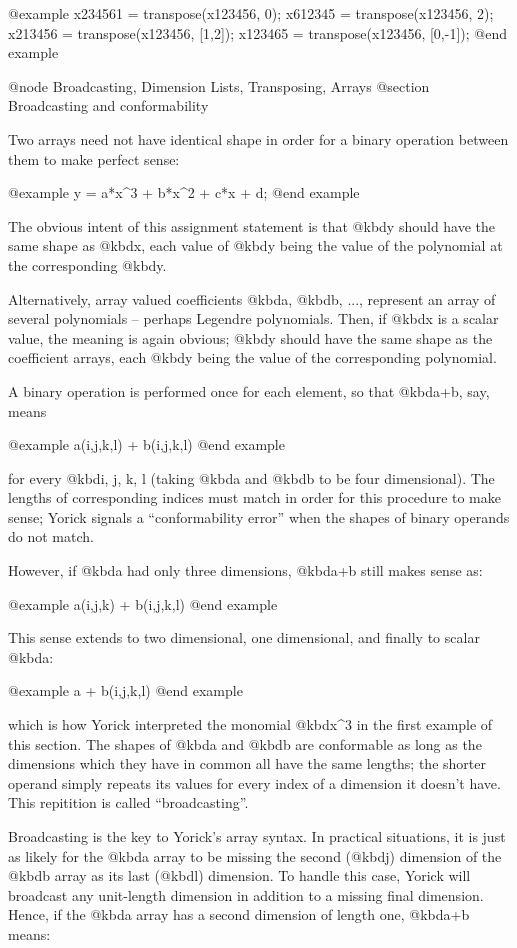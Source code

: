 @example
x234561 = transpose(x123456, 0);
x612345 = transpose(x123456, 2);
x213456 = transpose(x123456, [1,2]);
x123465 = transpose(x123456, [0,-1]);
@end example



@node    Broadcasting, Dimension Lists, Transposing, Arrays
@section Broadcasting and conformability

Two arrays need not have identical shape in order for a binary operation
between them to make perfect sense:

@example
y = a*x^3 + b*x^2 + c*x + d;
@end example

The obvious intent of this assignment statement is that @kbd{y} should
have the same shape as @kbd{x}, each value of @kbd{y} being the value of
the polynomial at the corresponding @kbd{y}.

Alternatively, array valued coefficients @kbd{a}, @kbd{b}, ...,
represent an array of several polynomials -- perhaps Legendre
polynomials.  Then, if @kbd{x} is a scalar value, the meaning is again
obvious; @kbd{y} should have the same shape as the coefficient arrays,
each @kbd{y} being the value of the corresponding polynomial.

A binary operation is performed once for each element, so that
@kbd{a+b}, say, means

@example
a(i,j,k,l) + b(i,j,k,l)
@end example

for every @kbd{i, j, k, l} (taking @kbd{a} and @kbd{b} to be four
dimensional).  The lengths of corresponding indices must match in order
for this procedure to make sense; Yorick signals a ``conformability
error'' when the shapes of binary operands do not match.

However, if @kbd{a} had only three dimensions, @kbd{a+b} still makes
sense as:

@example
a(i,j,k) + b(i,j,k,l)
@end example

This sense extends to two dimensional, one dimensional, and finally
to scalar @kbd{a}:

@example
a + b(i,j,k,l)
@end example

which is how Yorick interpreted the monomial @kbd{x^3} in the first
example of this section.  The shapes of @kbd{a} and @kbd{b} are
conformable as long as the dimensions which they have in common all
have the same lengths; the shorter operand simply repeats its values
for every index of a dimension it doesn't have.  This repitition is
called ``broadcasting''.

Broadcasting is the key to Yorick's array syntax.  In practical
situations, it is just as likely for the @kbd{a} array to be missing the
second (@kbd{j}) dimension of the @kbd{b} array as its last (@kbd{l})
dimension.  To handle this case, Yorick will broadcast any unit-length
dimension in addition to a missing final dimension.  Hence, if the
@kbd{a} array has a second dimension of length one, @kbd{a+b}
means:


